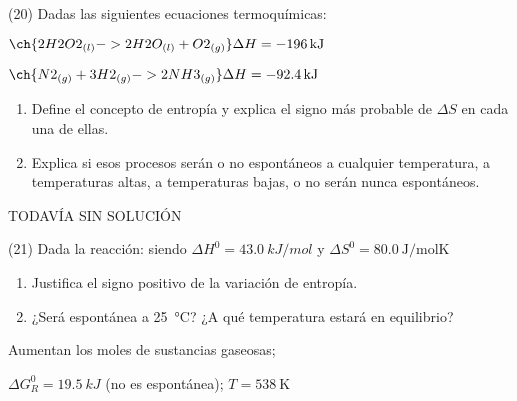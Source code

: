 \documentclass[10pt]{article}
\begin{document}
\begin{multicols}{2}
\begin{exercise}[
    tags    = {},
    topics  = {química,química básica},
    source  = {FQ 1B MGH 2016, p85, e26},
  ]

  (20) Dadas las siguientes ecuaciones termoquímicas:

  \( \ch{2 H2O2_{(l)} -> 2 H2O_{(l)} + O2_{(g)}} \Delta H = \SI{-196}{kJ} \)

  \( \ch{N2_{(g)} + 3 H2_{(g)} -> 2 NH3 _{(g)}} \Delta H = \SI{-92.4}{kJ} \)

  \begin{enumerate}
    \item Define el concepto de entropía y explica el signo más probable de \( \Delta S \) en cada una de ellas.
    \item Explica si esos procesos serán o no espontáneos a cualquier
    temperatura, a temperaturas altas, a temperaturas bajas, o no serán nunca espontáneos.
  \end{enumerate}
\end{exercise}

\begin{solution}[print=false]
  TODAVÍA SIN SOLUCIÓN
\end{solution}




\begin{exercise}[
    tags    = {},
    topics  = {química,química básica},
    source  = {FQ 1B MGH 2016, p85, e26},
  ]

  (21) Dada la reacción: 
  siendo \( \Delta H^0 = \SI{43.0}{kJ/mol} \) y \( \Delta S^0 = \SI{80.0}{\joule\per\mole\kelvin} \) %

  \begin{enumerate}
    \item Justifica el signo positivo de la variación de entropía.
    \item ¿Será espontánea a \SI{25}{\celsius}? ¿A qué temperatura estará en
    equilibrio?
  \end{enumerate}
\end{exercise}

\begin{solution}
  \begin{enumerate*}
    \item Aumentan los moles de sustancias gaseosas; \item \( \Delta G^0_R = \SI{19.5}{kJ} \) (no es espontánea); \( T = \SI{538}{\kelvin} \)
  \end{enumerate*}
\end{solution}





\end{multicols}
\end{document}
